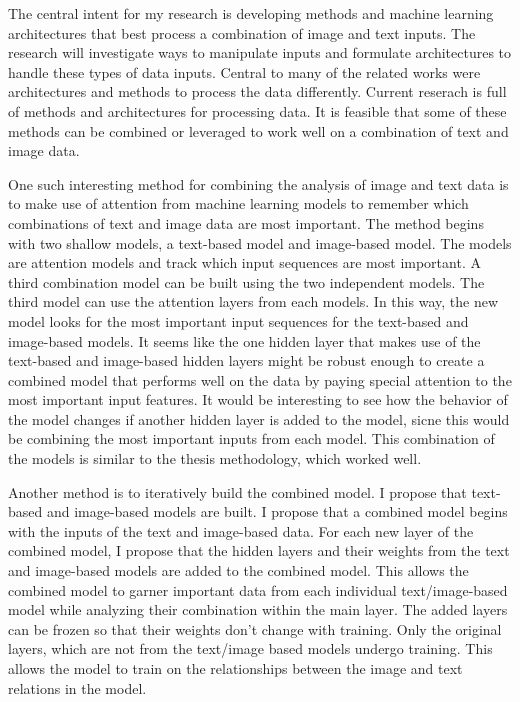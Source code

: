 The central intent for my research is developing methods and machine learning architectures that best process a combination of image and text inputs. The research will investigate ways to manipulate inputs and formulate architectures to handle these types of data inputs.  Central to many of the related works were architectures and methods to process the data differently.  Current reserach is full of methods and architectures for processing data. It is feasible that some of these methods can be combined or leveraged to work well on a combination of text and image data.

One such interesting method for combining the analysis of image and text data is to make use of attention from machine learning models to remember which combinations of text and image data are most important.  The method begins with two shallow models, a text-based model and image-based model.  The models are attention models and track which input sequences are most important.  A third combination model can be built using the two independent models.  The third model can use the attention layers from each models.  In this way, the new model looks for the most important input sequences for the text-based and image-based models. It seems like the one hidden layer that makes use of the text-based and image-based hidden layers might be robust enough to create a combined model that performs well on the data by paying special attention to the most important input features.  It would be interesting to see how the behavior of the model changes if another hidden layer is added to the model, sicne this would be combining the most important inputs from each model.  This combination of the models is similar to the thesis methodology, which worked well.

Another method is to iteratively build the combined model.  I propose that text-based and image-based models are built.  I propose that a combined model begins with the inputs of the text and image-based data. For each new layer of the combined model, I propose that the hidden layers and their weights from the text and image-based models are added to the combined model. This allows the combined model to garner important data from each individual text/image-based model while analyzing their combination within the main layer.  The added layers can be frozen so that their weights don't change with training.  Only the original layers, which are not from the text/image based models undergo training.  This allows the model to train on the relationships between the image and text relations in the model.


